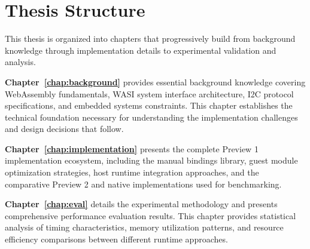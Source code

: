 



\section{Thesis Structure}
\label{sec:thesis-structure}

This thesis is organized into chapters that progressively build from background knowledge through implementation details to experimental validation and analysis.

\textbf{Chapter~\ref{chap:background}} provides essential background knowledge covering WebAssembly fundamentals, WASI system interface architecture, I2C protocol specifications, and embedded systems constraints. This chapter establishes the technical foundation necessary for understanding the implementation challenges and design decisions that follow.

\textbf{Chapter~\ref{chap:implementation}} presents the complete Preview 1 implementation ecosystem, including the manual bindings library, guest module optimization strategies, host runtime integration approaches, and the comparative Preview 2 and native implementations used for benchmarking.

\textbf{Chapter~\ref{chap:eval}} details the experimental methodology and presents comprehensive performance evaluation results. This chapter provides statistical analysis of timing characteristics, memory utilization patterns, and resource efficiency comparisons between different runtime approaches.

